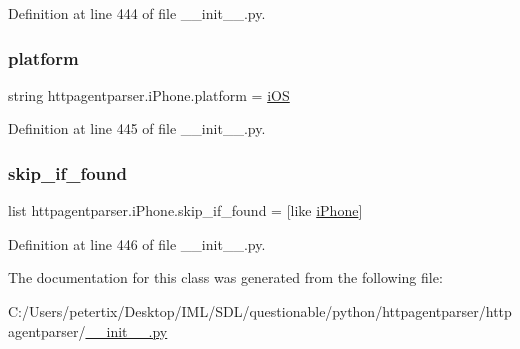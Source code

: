 Definition at line 444 of file \+\_\+\+\_\+init\+\_\+\+\_\+.\+py.

\hypertarget{classhttpagentparser_1_1i_phone_ad5c1eb47e0d7336f991c6c1e19dbe9f5}{}\label{classhttpagentparser_1_1i_phone_ad5c1eb47e0d7336f991c6c1e19dbe9f5} 
\subsubsection{\texorpdfstring{platform}{platform}}
{\footnotesize\ttfamily string httpagentparser.\+i\+Phone.\+platform = \textquotesingle{}\hyperlink{classhttpagentparser_1_1i_o_s}{i\+OS}\textquotesingle{}\hspace{0.3cm}{\ttfamily [static]}}



Definition at line 445 of file \+\_\+\+\_\+init\+\_\+\+\_\+.\+py.

\hypertarget{classhttpagentparser_1_1i_phone_ad1d4c99e1d046ea17d1a99d14b21ca7b}{}\label{classhttpagentparser_1_1i_phone_ad1d4c99e1d046ea17d1a99d14b21ca7b} 
\subsubsection{\texorpdfstring{skip\+\_\+if\+\_\+found}{skip\_if\_found}}
{\footnotesize\ttfamily list httpagentparser.\+i\+Phone.\+skip\+\_\+if\+\_\+found = \mbox{[}\textquotesingle{}like \hyperlink{classhttpagentparser_1_1i_phone}{i\+Phone}\textquotesingle{}\mbox{]}\hspace{0.3cm}{\ttfamily [static]}}



Definition at line 446 of file \+\_\+\+\_\+init\+\_\+\+\_\+.\+py.



The documentation for this class was generated from the following file\+:\begin{DoxyCompactItemize}
\item 
C\+:/\+Users/petertix/\+Desktop/\+I\+M\+L/\+S\+D\+L/questionable/python/httpagentparser/httpagentparser/\hyperlink{____init_____8py}{\+\_\+\+\_\+init\+\_\+\+\_\+.\+py}\end{DoxyCompactItemize}
